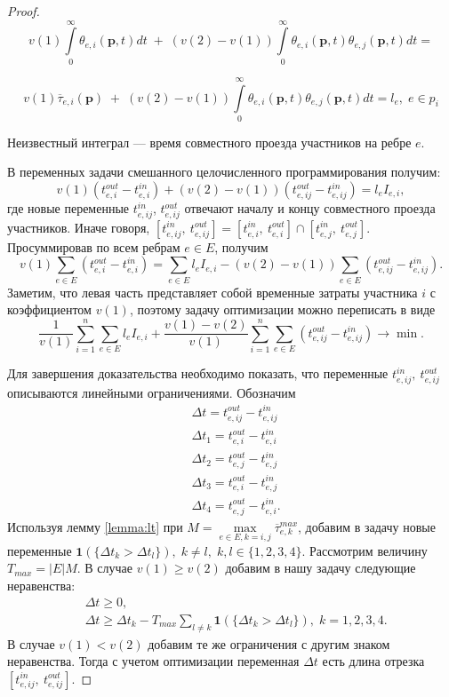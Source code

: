 \documentclass[12pt, a4paper]{article}
\DeclareMathOperator*{\minn}{min}
\begin{document}
\begin{proof}
	$$v (1) \int\limits_{0}^{\infty} \theta_{e, i} (\textbf{p}, t) dt \; + \;
	  (v (2) - v(1)) \int\limits_{0}^{\infty} \theta_{e, i} (\textbf{p}, t) \theta_{e, j} (\textbf{p}, t) dt = $$
	  
    $$v (1) \overline{\tau}_{e, i} (\textbf{p}) \; + \;
    (v (2) - v(1)) \int\limits_{0}^{\infty} \theta_{e, i} (\textbf{p}, t) \theta_{e, j} (\textbf{p}, t) dt = l_e, \; e \in p_i$$
	  
	Неизвестный интеграл --- время совместного проезда участников на ребре $e$.
	  
	В переменных задачи смешанного целочисленного программирования получим:
	$$v(1) (t_{e, i}^{out} - t_{e, i}^{in}) + (v(2) - v(1)) (t_{e, ij}^{out} - t_{e, ij}^{in}) = l_e I_{e, i},$$
	где новые переменные $t_{e, ij}^{in}$, $t_{e, ij}^{out}$ отвечают началу и концу совместного проезда участников. Иначе говоря, $[t_{e, ij}^{in}, \: t_{e, ij}^{out}] = [t_{e, i}^{in}, \: t_{e, i}^{out}] \cap [t_{e, j}^{in}, \: t_{e, j}^{out}]$. Просуммировав по всем ребрам $e \in E$, получим
	$$v(1) \sum \limits _{e \in E} (t_{e, i}^{out} - t_{e, i}^{in}) = \sum \limits _{e \in E} l_e I_{e, i} - (v(2) - v(1)) \sum \limits _{e \in E} (t_{e, ij}^{out} - t_{e, ij}^{in}).$$
	Заметим, что левая часть представляет собой временные затраты участника $i$ с коэффициентом $v(1)$, поэтому задачу оптимизации можно переписать в виде
	$$ \frac{1}{v (1)} \sum\limits_{i = 1}^n \sum \limits _{e \in E} l_e I_{e, i} + \frac{v(1) - v(2)}{v (1)}  \sum\limits_{i = 1}^n \sum \limits _{e \in E} (t_{e, ij}^{out} - t_{e, ij}^{in}) \rightarrow \minn .$$
	
	Для завершения доказательства необходимо показать, что переменные $t_{e, ij}^{in}, \: t_{e, ij}^{out}$ описываются линейными ограничениями. Обозначим
	\begin{align*}
		& \Delta t = t_{e, ij}^{out} - t_{e, ij}^{in} \\
		& \Delta t_1 =  t_{e, i}^{out} - t_{e, i}^{in}  \\
		& \Delta t_2 =  t_{e, j}^{out} - t_{e, j}^{in} \\
		& \Delta t_3 =  t_{e, i}^{out} - t_{e, j}^{in} \\
		& \Delta t_4 =  t_{e, j}^{out} - t_{e, i}^{in}.
	\end{align*}
	Используя лемму \ref{lemma:lt} при $M = \max\limits_{e \in E, k = i, j} \overline{\tau}_{e, k}^{max}$, добавим в задачу новые переменные $\textbf{1} (\{ \Delta t_k > \Delta t_l\}), \; k \ne l, \; k, l \in \{1, 2, 3, 4\}$. Рассмотрим величину $T_{max} = |E|M$. В случае $v(1) \ge v(2)$ добавим в нашу задачу следующие неравенства: 
	\begin{align*}
	& \Delta t \ge 0, \\
	& \Delta t \ge \Delta t_k - T_{max} \sum \limits_{l \ne k} {\textbf{1} (\{ \Delta t_k > \Delta t_l\})}, \; k = 1, 2, 3, 4.
	\end{align*}
	В случае $v(1) < v(2)$ добавим те же ограничения с другим знаком неравенства. Тогда с учетом оптимизации переменная $\Delta t$ есть длина отрезка $[t_{e, ij}^{in}, \: t_{e, ij}^{out}]$. 
	
\end{proof}
\end{document}
